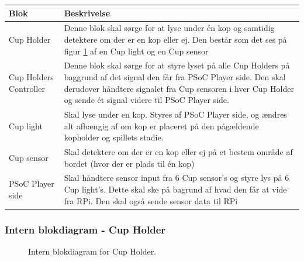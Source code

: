 \documentclass[Arkitektur/System_main.tex]{subfiles}
\begin{document}
\begin{table}[H]
\centering
\begin{tabular}{|L{0.2\columnwidth}|L{0.7\columnwidth}|}
\hline
\textbf{Blok} & \textbf{Beskrivelse} \\ \hline
Cup Holder & Denne blok skal sørge for at lyse under én kop og samtidig detektere om der er en kop eller ej. Den består som det ses på figur \ref{fig:playerside_hardware_bdd} af en Cup light og en Cup sensor \\ \hline
Cup Holders Controller & Denne blok skal sørge for at styre lyset på alle Cup Holders på baggrund af det signal den får fra PSoC Player side. Den skal derudover håndtere signalet fra Cup sensoren i hver Cup Holder og sende ét signal videre til PSoC Player side. \\ \hline
Cup light & Skal lyse under en kop. Styres af PSoC Player side, og ændres alt afhængig af om kop er placeret på den pågældende kopholder og spillets stadie.\\ \hline
Cup sensor & Skal detektere om der er en kop eller ej på et bestem område af bordet (hvor der er plads til én kop)\\ \hline
PSoC Player side & Skal håndtere sensor input fra 6 Cup sensor's og styre lys på 6 Cup light's. Dette skal ske på bagrund af hvad den får at vide fra RPi. Den skal også sende sensor data til RPi\\ \hline
\end{tabular}
\end{table}

\subsubsection{Intern blokdiagram - Cup Holder}
\begin{figure}[H]
    \centering
    \caption{Intern blokdiagram for Cup Holder.}
    \label{fig:playerside_hardware_bdd}
\end{figure}
\end{document}
